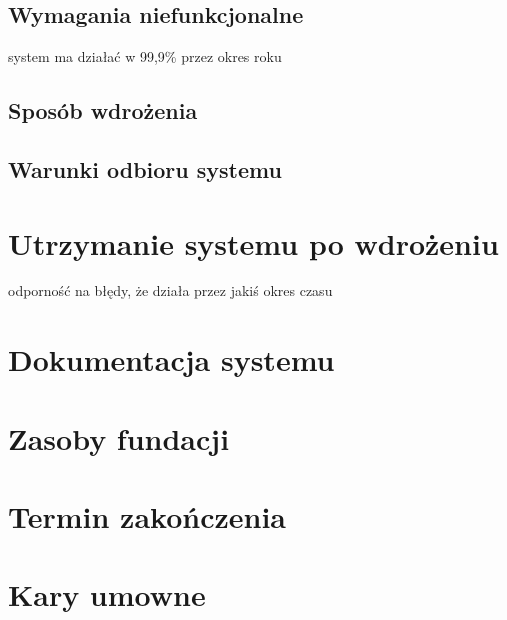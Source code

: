 \documentclass{article}
\begin{document}
\subsection{Wymagania niefunkcjonalne}
system ma działać w 99,9\% przez okres roku

\subsection{Sposób wdrożenia}

\subsection{Warunki odbioru systemu}
\section{Utrzymanie systemu po wdrożeniu}
odporność na błędy, że działa przez jakiś okres czasu

\section{Dokumentacja systemu}
\section{Zasoby fundacji}

\section{Termin zakończenia}

\section{Kary umowne}
\end{document}
